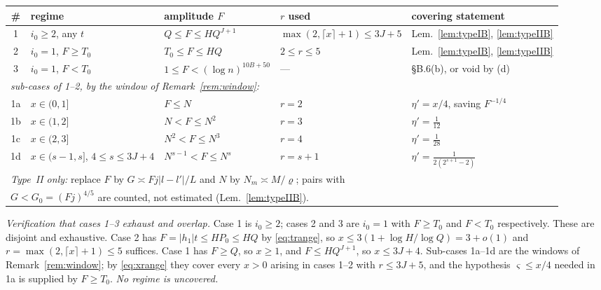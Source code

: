 \documentclass[11pt]{article}
\theoremstyle{definition}
\theoremstyle{plain}
\begin{document}
\begin{center}
\footnotesize
\setlength{\tabcolsep}{2.5pt}
\begin{tabular}{|c|l|l|l|l|}
\hline
\# & regime & amplitude $F$ & $r$ used & covering statement\\
\hline
1 & $i_{0}\ge2$, any $t$ & $Q\le F\le HQ^{J+1}$ & $\max(2,\lceil x\rceil+1)\le3J+5$
& Lem.~\ref{lem:typeIB}, \ref{lem:typeIIB}\\
2 & $i_{0}=1$, $F\ge T_{0}$ & $T_{0}\le F\le HQ$ & $2\le r\le5$
& Lem.~\ref{lem:typeIB}, \ref{lem:typeIIB}\\
3 & $i_{0}=1$, $F<T_{0}$ & $1\le F<(\log n)^{10B+50}$ & ---
& \S B.6(b), or void by (d)\\
\hline
\multicolumn{5}{|l|}{\emph{sub-cases of 1--2, by the window of Remark~\ref{rem:window}:}}\\
\hline
1a & $x\in(0,1]$ & $F\le N$ & $r=2$ & $\eta'=x/4$, saving $F^{-1/4}$\\
1b & $x\in(1,2]$ & $N<F\le N^{2}$ & $r=3$ & $\eta'=\tfrac1{12}$\\
1c & $x\in(2,3]$ & $N^{2}<F\le N^{3}$ & $r=4$ & $\eta'=\tfrac1{28}$\\
1d & $x\in(s-1,s]$, $4\le s\le3J{+}4$ & $N^{s-1}<F\le N^{s}$ & $r=s+1$
& $\eta'=\frac{1}{2(2^{s+1}-2)}$\\
\hline
\multicolumn{5}{|l|}{\emph{Type~II only:} replace $F$ by
$G\asymp Fj|l-l'|/L$ and $N$ by $N_{m}\asymp M/\varrho$; pairs with}\\
\multicolumn{5}{|l|}{$G<G_{0}=(Fj)^{4/5}$ are counted, not estimated
(Lem.~\ref{lem:typeIIB}).}\\
\hline
\end{tabular}
\end{center}

\noindent\emph{Verification that cases 1--3 exhaust and overlap.}  Case 1
is $i_{0}\ge2$; cases 2 and 3 are $i_{0}=1$ with $F\ge T_{0}$ and
$F<T_{0}$ respectively.  These are disjoint and exhaustive.  Case 2 has
$F=|h_{1}|t\le HP_{0}\le HQ$ by \eqref{eq:trange}, so
$x\le3(1+\log H/\log Q)=3+o(1)$ and $r=\max(2,\lceil x\rceil+1)\le5$
suffices.  Case 1 has $F\ge Q$, so
$x\ge1$, and $F\le HQ^{J+1}$, so $x\le3J+4$.  Sub-cases 1a--1d are the
windows of Remark~\ref{rem:window}; by \eqref{eq:xrange} they cover every
$x>0$ arising in cases 1--2 with $r\le3J+5$, and the hypothesis
$\varsigma\le x/4$ needed in 1a is supplied by $F\ge T_{0}$.
\emph{No regime is uncovered.}
\end{document}

